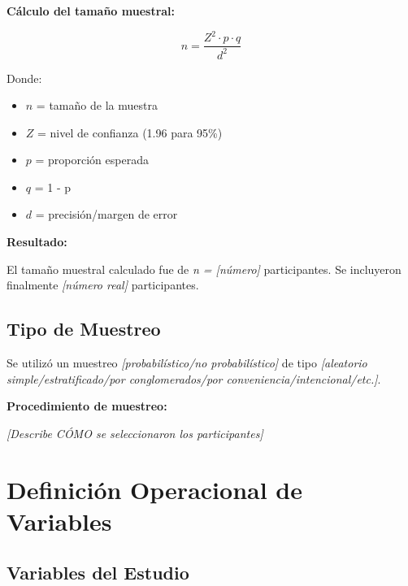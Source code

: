 \textbf{Cálculo del tamaño muestral:}

\begin{equation}
n = \frac{Z^2 \cdot p \cdot q}{d^2}
\label{eq:tamano_muestra}
\end{equation}

Donde:
\begin{itemize}
    \item $n$ = tamaño de la muestra
    \item $Z$ = nivel de confianza (1.96 para 95\%)
    \item $p$ = proporción esperada
    \item $q$ = 1 - p
    \item $d$ = precisión/margen de error
\end{itemize}

\textbf{Resultado:}

El tamaño muestral calculado fue de \textit{n = [número]} participantes. Se incluyeron finalmente \textit{[número real]} participantes.

\subsection{Tipo de Muestreo}
\label{subsec:tipo_muestreo}

Se utilizó un muestreo \textit{[probabilístico/no probabilístico]} de tipo \textit{[aleatorio simple/estratificado/por conglomerados/por conveniencia/intencional/etc.]}.

\textbf{Procedimiento de muestreo:}

\textit{[Describe CÓMO se seleccionaron los participantes]}

\section{Definición Operacional de Variables}
\label{sec:variables}


\subsection{Variables del Estudio}
\label{subsec:variables_estudio}

